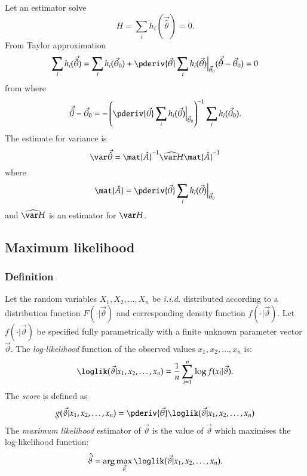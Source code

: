 \documentclass[a4paper]{article}
\newcommand{\iid}{\textit{i.i.d.}\xspace}
\numberwithin{equation}{subsection}
\begin{document}
Let an estimator solve
\begin{equation}
  H = \sum_{i} h_{i}(\vec{\hat{\theta}}) = 0.
\end{equation}
From Taylor approximation
\begin{equation}
  \sum_{i} h_{i}(\vec{\hat{\theta}}) 
  = 
  \sum_{i} h_{i}(\vec{\theta}_{0}) 
  +
  \pderiv{\vec{\theta}} 
  \sum_{i} h_{i}(\vec{\theta})\Big|_{\vec{\theta}_{0}}
  (\vec{\hat{\theta}} - \vec{\theta}_{0} )
  = 0
\end{equation}
from where
\begin{equation}
  \vec{\hat{\theta}} - \vec{\theta}_{0} 
  =
  -\left(
    \pderiv{\vec{\theta}} 
    \sum_{i} h_{i}(\vec{\theta})\Big|_{\vec{\theta}_{0}}
  \right)^{-1}    
  \sum_{i} h_{i}(\vec{\theta}_{0}).
\end{equation}
The estimate for variance is
\begin{equation}
  \label{eq:M-estimator_variance}
  \var \vec{\hat{\theta}} =
  \mat{\hat{A}}^{-1} \widehat{\var H} \mat{\hat{A}}^{-1}
\end{equation}
where
\begin{equation}
  \label{eq:M-estimators_A}
  \mat{\hat{A}} = 
  \pderiv{\vec{\theta}} 
  \sum_{i} h_{i}(\vec{\theta})\Big|_{\vec{\theta}_{0}}
\end{equation}
and $\widehat{\var H}$ is an estimator for $\var H$.


\subsection{Maximum likelihood}
\label{sec:maxlik}

\subsubsection{Definition}
\label{sec:ml_definition}

Let the random variables $X_1, X_2, \dots, X_n$ be \iid distributed
according to a distribution function $F(\cdot|\vec{\vartheta})$ and
corresponding density function $
f(\cdot|\vec{\vartheta})$.
Let $f(\cdot|\vec{\vartheta})$ be specified fully parametrically with
a finite unknown parameter vector $\vec{\vartheta}$.  The
\emph{log-likelihood} function of the observed values $x_{1}, x_{2}, \dots,
x_{n}$ is:
\begin{equation}
  \loglik(\vec{\vartheta}|x_1, x_2, \dots, x_n)
  =
  \frac{1}{n}
  \sum_{i=1}^n
  \log f(x_i|\vec{\vartheta}).
\end{equation}
The \emph{score} is defined as
\begin{equation}
  \label{eq:ml_score}
  g(\vec{\vartheta}|x_1, x_2, \dots, x_n)
  =
  \pderiv{\vec{\theta}} \loglik(\vec{\vartheta}|x_1, x_2, \dots, x_n)  
\end{equation}
The \emph{maximum likelihood} estimator of $\vec{\vartheta}$ is the
value of $\vec{\vartheta}$ which maximises the log-likelihood
function:
\begin{equation}
  \hat{\vec{\vartheta}}
  =
  \arg \max_{\vec{\vartheta}}
  \loglik(\vec{\vartheta}|x_1, x_2, \dots, x_n).
\end{equation}
\end{document}
